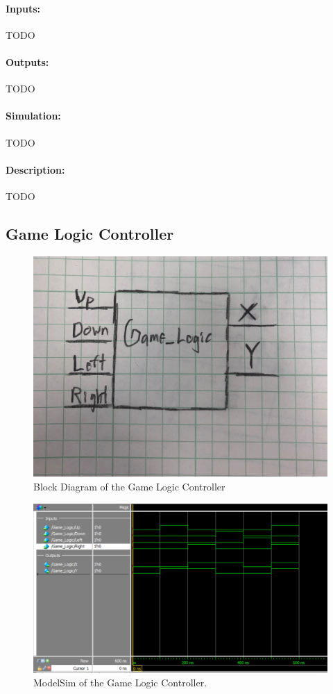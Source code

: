 \documentclass[]{article}
\begin{document}
\paragraph{Inputs:} TODO
\paragraph{Outputs:} TODO
\paragraph{Simulation:} TODO
\paragraph{Description:} TODO

\subsection{Game Logic Controller}
\begin{figure}[H]\centering
	\includegraphics[width=\linewidth]{figures/Game_Logic_Diagram}
	\caption{Block Diagram of the Game Logic Controller}
\end{figure}
\begin{figure}[H]\centering
	\includegraphics[width=\linewidth]{figures/Game_Logic_ModelSim.png}
	\caption{ModelSim of the Game Logic Controller.}
\end{figure}
\end{document}
